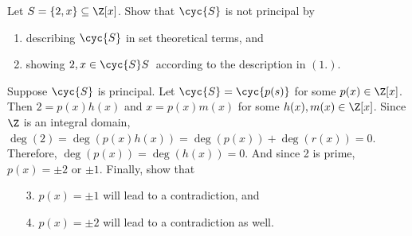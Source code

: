 \documentclass[10pt]{article}
\begin{document}
\begin{problem}
    Let $S=\{2,x\}\subseteq \Z[x]$. Show that $\cyc{S}$ is not principal by
    \begin{enumerate}
        \item describing $\cyc{S}$ in set theoretical terms, and
        \item showing $2,x\in\cyc{S}S\>$ according to the description in $(1.)$.
    \end{enumerate}
    Suppose $\cyc{S}$ is principal. Let $\cyc{S}=\cyc{p(s)}$ for some $p(x)\in\Z[x]$. Then $2=p(x)h(x)$ and $x=p(x)m(x)$ for some $h(x),m(x)\in\Z[x]$. Since $\Z$ is an integral domain, $\deg(2)=\deg(p(x)h(x))=\deg(p(x))+\deg(r(x))=0$. Therefore, $\deg(p(x))=\deg(h(x))=0$. And since 2 is prime, $p(x)=\pm 2$ or $\pm 1$. Finally, show that
    \begin{enumerate}
        \item[3.] $p(x)=\pm 1$ will lead to a contradiction, and
        \item[4.] $p(x)=\pm 2$ will lead to a contradiction as well. 
    \end{enumerate}
\end{problem}


\newpage
\end{document}
